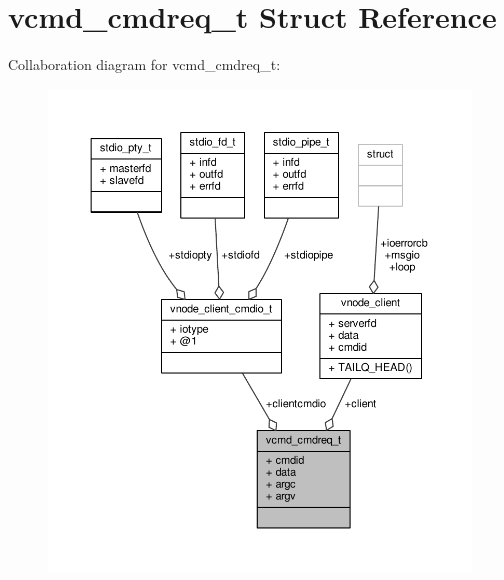 \hypertarget{structvcmd__cmdreq__t}{\section{vcmd\+\_\+cmdreq\+\_\+t Struct Reference}
\label{structvcmd__cmdreq__t}
}


Collaboration diagram for vcmd\+\_\+cmdreq\+\_\+t\+:
\nopagebreak
\begin{figure}[H]
\begin{center}
\leavevmode
\includegraphics[width=350pt]{structvcmd__cmdreq__t__coll__graph}
\end{center}
\end{figure}
